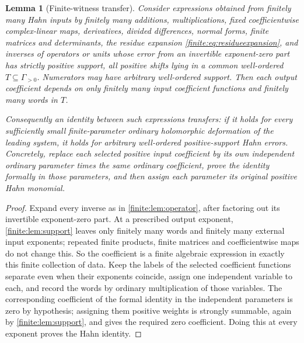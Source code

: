 \documentclass[11pt,letterpaper]{article}
\newtheorem{lemma}[theorem]{Lemma}
\theoremstyle{definition}
\theoremstyle{remark}
\numberwithin{equation}{section}
\begin{document}
\begin{lemma}[Finite-witness transfer]
\label{finite:lem:witness}
Consider expressions obtained from finitely many Hahn inputs by finitely many additions, multiplications, fixed coefficientwise complex-linear maps, derivatives, divided differences, normal forms, finite matrices and determinants, the residue expansion \eqref{finite:eq:residueexpansion}, and inverses of operators or units whose error from an invertible exponent-zero part has strictly positive support, all positive shifts lying in a common well-ordered $T\subseteq\Gamma_{>0}$. Numerators may have arbitrary well-ordered support. Then each output coefficient depends on only finitely many input coefficient functions and finitely many words in $T$.

Consequently an identity between such expressions transfers: if it holds for every sufficiently small finite-parameter ordinary holomorphic deformation of the leading system, it holds for arbitrary well-ordered positive-support Hahn errors. Concretely, replace each selected positive input coefficient by its own independent ordinary parameter times the same ordinary coefficient, prove the identity formally in those parameters, and then assign each parameter its original positive Hahn monomial.
\end{lemma}

\begin{proof}
Expand every inverse as in \cref{finite:lem:operator}, after factoring out its invertible exponent-zero part. At a prescribed output exponent, \cref{finite:lem:support} leaves only finitely many words and finitely many external input exponents; repeated finite products, finite matrices and coefficientwise maps do not change this. So the coefficient is a finite algebraic expression in exactly this finite collection of data. Keep the labels of the selected coefficient functions separate even when their exponents coincide, assign one independent variable to each, and record the words by ordinary multiplication of those variables. The corresponding coefficient of the formal identity in the independent parameters is zero by hypothesis; assigning them positive weights is strongly summable, again by \cref{finite:lem:support}, and gives the required zero coefficient. Doing this at every exponent proves the Hahn identity.
\end{proof}
\end{document}
